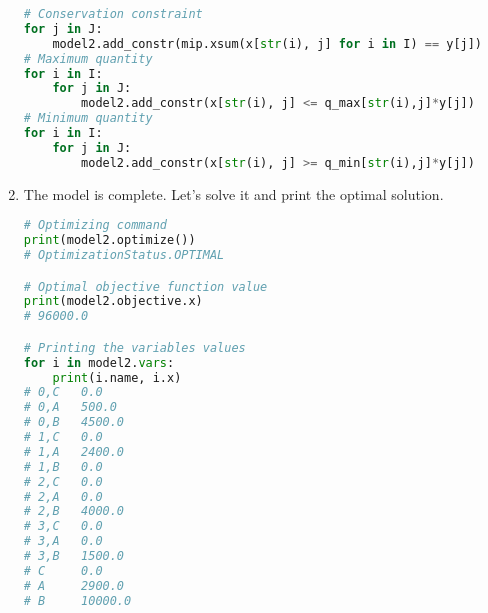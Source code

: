 \begin{enumerate}
\begin{lstlisting}[language=Python]
# Conservation constraint
for j in J:
    model2.add_constr(mip.xsum(x[str(i), j] for i in I) == y[j])
# Maximum quantity
for i in I:
    for j in J:
        model2.add_constr(x[str(i), j] <= q_max[str(i),j]*y[j])
# Minimum quantity
for i in I:
    for j in J:
        model2.add_constr(x[str(i), j] >= q_min[str(i),j]*y[j])\end{lstlisting}

\newpage
    \item The model is complete. Let's solve it and print the optimal solution.
    \begin{lstlisting}[language=Python]
# Optimizing command
print(model2.optimize())
# OptimizationStatus.OPTIMAL

# Optimal objective function value
print(model2.objective.x)
# 96000.0

# Printing the variables values
for i in model2.vars:
    print(i.name, i.x)
# 0,C   0.0
# 0,A   500.0
# 0,B   4500.0
# 1,C   0.0
# 1,A   2400.0
# 1,B   0.0
# 2,C   0.0
# 2,A   0.0
# 2,B   4000.0
# 3,C   0.0
# 3,A   0.0
# 3,B   1500.0
# C     0.0
# A     2900.0
# B     10000.0\end{lstlisting}
\end{enumerate}